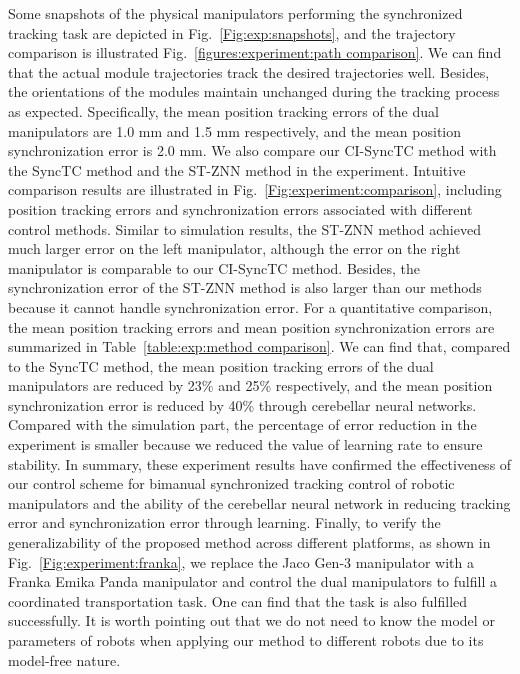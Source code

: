 \documentclass[journal,twoside,web]{ieeecolor}
\begin{document}
Some snapshots of the physical manipulators performing the synchronized tracking task are depicted in Fig.~\ref{Fig:exp:snapshots}, and the trajectory comparison is illustrated Fig.~\ref{figures:experiment:path comparison}. We can find that the actual module trajectories track the desired trajectories well. Besides, the orientations of the modules maintain unchanged during the tracking process as expected. Specifically, the mean position tracking errors of the dual manipulators are 1.0 mm and 1.5 mm respectively, and the mean position synchronization error is 2.0 mm. We also compare our CI-SyncTC method with the SyncTC method and the ST-ZNN method in the experiment. Intuitive comparison results are illustrated in Fig.~\ref{Fig:experiment:comparison}, including position tracking errors and synchronization errors associated with different control methods. Similar to simulation results, the ST-ZNN method achieved much larger error on the left manipulator, although the error on the right manipulator is comparable to our CI-SyncTC method. Besides, the synchronization error of the ST-ZNN method is also larger than our methods because it cannot handle synchronization error. For a quantitative comparison, the mean position tracking errors and mean position synchronization errors are summarized in Table~\ref{table:exp:method comparison}. We can find that, compared to the SyncTC method, the mean position tracking errors of the dual manipulators are reduced by 23\% and 25\% respectively, and the mean position synchronization error is reduced by 40\% through cerebellar neural networks. Compared with the simulation part, the percentage of error reduction in the experiment is smaller because we reduced the value of learning rate to ensure stability. In summary, these experiment results have confirmed the effectiveness of our control scheme for bimanual synchronized tracking control of robotic manipulators and the ability of the cerebellar neural network in reducing tracking error and synchronization error through learning. Finally, to verify the generalizability of the proposed method across different platforms, as shown in Fig.~\ref{Fig:experiment:franka}, we replace the Jaco Gen-3 manipulator with a Franka Emika Panda manipulator and control the dual manipulators to fulfill a coordinated transportation task. One can find that the task is also fulfilled successfully. It is worth pointing out that we do not need to know the model or parameters of robots when applying our method to different robots due to its model-free nature.
\end{document}
